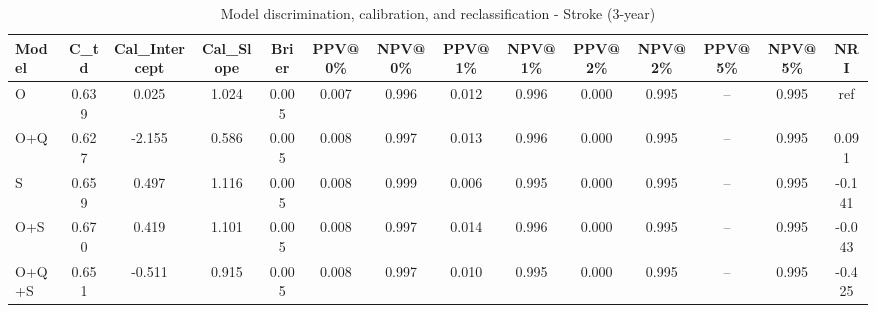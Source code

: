 \begin{table}[htbp]
\centering
\small
\caption{Model discrimination, calibration, and reclassification - Stroke (3-year)}
\label{tab:perf_stroke_3y}
\begin{tabular}{lccccccccccccc}
\toprule
Model & C\_td & Cal\_Intercept & Cal\_Slope & Brier & PPV@0\% & NPV@0\% & PPV@1\% & NPV@1\% & PPV@2\% & NPV@2\% & PPV@5\% & NPV@5\% & NRI \\
\midrule
O & 0.639 & 0.025 & 1.024 & 0.005 & 0.007 & 0.996 & 0.012 & 0.996 & 0.000 & 0.995 & -- & 0.995 & ref \\
O+Q & 0.627 & -2.155 & 0.586 & 0.005 & 0.008 & 0.997 & 0.013 & 0.996 & 0.000 & 0.995 & -- & 0.995 & 0.091 \\
S & 0.659 & 0.497 & 1.116 & 0.005 & 0.008 & 0.999 & 0.006 & 0.995 & 0.000 & 0.995 & -- & 0.995 & -0.141 \\
O+S & 0.670 & 0.419 & 1.101 & 0.005 & 0.008 & 0.997 & 0.014 & 0.996 & 0.000 & 0.995 & -- & 0.995 & -0.043 \\
O+Q+S & 0.651 & -0.511 & 0.915 & 0.005 & 0.008 & 0.997 & 0.010 & 0.995 & 0.000 & 0.995 & -- & 0.995 & -0.425 \\
\bottomrule
\end{tabular}
\end{table}